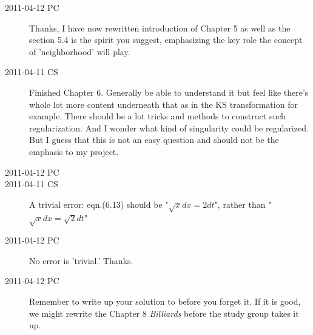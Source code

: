 \begin{description}
\item[2011-04-12 PC] Thanks, I have now rewritten introduction of
Chapter 5 as well as the section 5.4 is the spirit you suggest,
emphasizing the key role the concept of 'neighborhood' will play.

\item[2011-04-11 CS]
Finished Chapter 6. Generally be able to understand it but feel like there's whole lot more content underneath that as in the KS transformation for example. There should be a lot tricks and methods to construct such regularization. And I wonder what kind of singularity could be regularized. But I guess that this is not an easy question and should not be the emphasis to my project.

\item[2011-04-12 PC] 

\item[2011-04-11 CS]
A trivial error: eqn.(6.13) should be "$\sqrt{x}dx = 2dt$", 
rather than "$\sqrt{x}dx = \sqrt{2}dt$"

\item[2011-04-12 PC]
No error is 'trivial.' Thanks.

\item[2011-04-12 PC] Remember to write up your solution to 
 before you forget it. If it is good, we might
rewrite the Chapter 8 {\em Billiards} before the study group takes it up.


\end{description}
